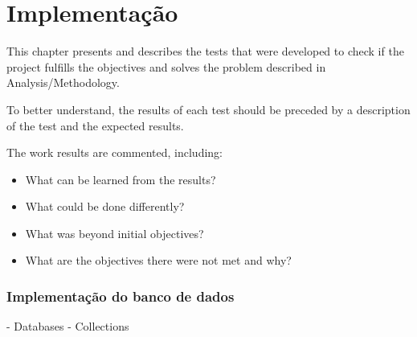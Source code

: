 




\chapter{Implementação}\label{cap:test}

This chapter presents and describes the tests that were developed to check if the project fulfills the objectives and solves the problem described in Analysis/Methodology.

To better understand, the results of each test should be preceded by a description of the test and the expected results.

The work results are commented, including:

\begin{itemize}
	\item  What can be learned from the results?
	\item What could be done differently? 
	\item What was beyond initial objectives?
	\item What are the objectives there were not met and why?
\end{itemize}


\subsection[Implementação do banco de dados]{Implementação do banco de dados}
- Databases
- Collections

